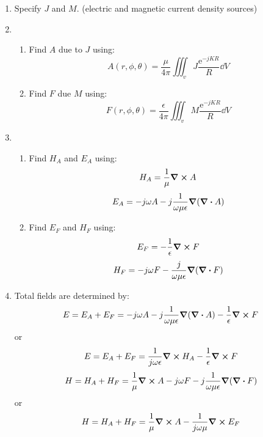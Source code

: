 \documentclass[class=article, crop=false]{standalone}
\begin{document}
    \begin{enumerate}
        \item Specify $J$ and $M$. (electric and magnetic current density sources)
        \item \begin{enumerate}
                  \item Find $A$ due to $J$ using: \begin{equation}
                             A(r, \phi, \theta) = \frac{\mu}{4 \pi} \iiint_v J \frac{\mathrm{e}^{-jKR}}{R} \dd V
                  \end{equation}
                  \item Find $F$ due $M$ using:  \begin{equation}
                             F(r, \phi, \theta) = \frac{\epsilon}{4 \pi} \iiint_v M \frac{\mathrm{e}^{-jKR}}{R} \dd V
                  \end{equation}
        \end{enumerate}
        \item \begin{enumerate}
                  \item Find $H_A$ and $E_A$ using:
                  \begin{equation}
                                H_A = \frac{1}{\mu} \curl A
                  \end{equation}
                  \begin{equation}
                                E_A = -j \omega A - j \frac{1}{\omega \mu \epsilon} \grad (\div A)
                  \end{equation}
                  \item Find $E_F$ and $H_F$ using:
                  \begin{equation}
                      E_F = - \frac{1}{\epsilon} \curl F
                  \end{equation}
                  \begin{equation}
                      H_F = - j \omega F - \frac{j}{\omega \mu \epsilon} \grad (\div F)
                  \end{equation}
        \end{enumerate}
        \item Total fields are determined by:
        \begin{equation}
            E = E_A + E_F = - j \omega A - j \frac{1}{\omega \mu \epsilon} \grad (\div A) - \frac{1}{\epsilon} \curl F
        \end{equation} or
        \begin{equation}
            E = E_A + E_F = \frac{1}{j \omega \epsilon} \curl H_A - \frac{1}{\epsilon} \curl F
        \end{equation}
        \begin{equation}
            H = H_A + H_F = \frac{1}{\mu} \curl A - j \omega F - j \frac{1}{\omega \mu \epsilon} \grad (\div F)
        \end{equation} or
        \begin{equation}
            H = H_A + H_F = \frac{1}{\mu} \curl A - \frac{1}{j \omega \mu} \curl E_F
        \end{equation}
    \end{enumerate}
\end{document}
